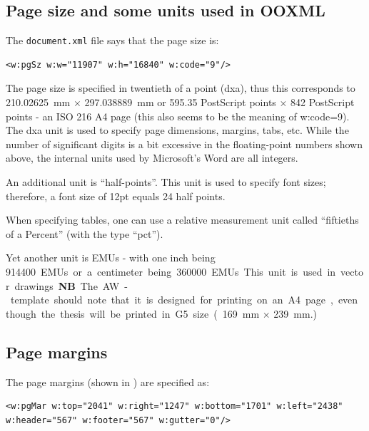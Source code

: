 \documentclass[12pt, twoside]{article}
\begin{document}
\subsection{Page size and some units used in OOXML}
The \texttt{document.xml} file says that the page size is:
\begin{lstlisting}[style=OOXML]
<w:pgSz w:w="11907" w:h="16840" w:code="9"/>
\end{lstlisting}

The page size is specified in twentieth of a point (\ie dxa), thus this
corresponds to \qty{210.02625}{\milli\metre} $\times$ \qty{297.038889}{\milli\metre} or 595.35 PostScript points $\times$ 842 PostScript points - \ie an ISO 216 A4 page (this also seems to be the meaning of w:code=9). The dxa unit is used to specify page dimensions, margins, tabs, etc. While the number of significant digits is a bit excessive in the floating-point numbers shown above, the internal units used by Microsoft's Word are all integers.

An additional unit is ``half-points''. This unit is used to specify font sizes; therefore, a font size of 12pt equals 24 half points.

When specifying tables, one can use a relative measurement unit called ``fiftieths of a Percent'' (with the type ``pct'').

Yet another unit is \glspl{EMU} - with one inch being \qty{914400} EMUs or a centimeter being \qty{360000} EMUs. This unit is used in vector drawings.

\textbf{NB} The AW-template should note that it is designed for printing on an A4 page, even though the thesis will be printed in G5 size (\qty{169}{\milli\metre} $\times$ \qty{239}{\milli\metre}.) 


\subsection{Page margins}
The page margins (shown in ) are specified as:
\begin{lstlisting}[style=OOXML]
<w:pgMar w:top="2041" w:right="1247" w:bottom="1701" w:left="2438" w:header="567" w:footer="567" w:gutter="0"/>
\end{lstlisting}
\end{document}
